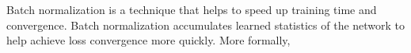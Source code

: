 Batch normalization is a technique that helps to speed up training time and convergence. Batch normalization accumulates learned statistics of the network to help achieve loss convergence more quickly. More formally,







